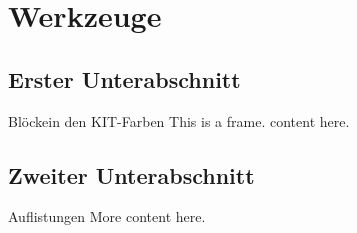 \section{Werkzeuge}

\subsection{Erster Unterabschnitt}
\begin{frame}{Blöcke}{in den KIT-Farben}
    This is a frame. content here.
\end{frame}

\subsection{Zweiter Unterabschnitt}
\begin{frame}{Auflistungen}
    More content here.
\end{frame}

